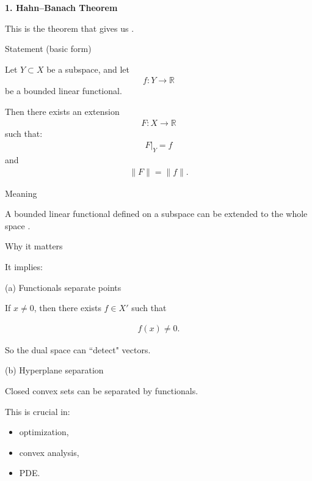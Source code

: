 \documentclass[12pt,a4paper]{report}
\begin{document}
\begin{description}

\item \textbf{1. Hahn–Banach Theorem}

This is the theorem that gives us .

	\begin{description}
    \item Statement (basic form)

Let $Y\subset X$ be a subspace, and let
\begin{align*}
f:Y\to \mathbb{R}
\end{align*}
be a bounded linear functional.

Then there exists an extension
\begin{align*}
F:X\to\mathbb{R}
\end{align*}
such that:
\begin{align*}
F|_Y=f
\end{align*}
and
\begin{align*}
\|F\|=\|f\|.
\end{align*}

    \item Meaning

A bounded linear functional defined on a subspace can be extended to the whole space .

    \item Why it matters

It implies:
		\begin{description}
        \item (a) Functionals separate points

If $x\neq 0$, then there exists $f\in X'$ such that

\begin{align*}
f(x)\neq 0.
\end{align*}

So the dual space can ``detect" vectors.

        \item (b) Hyperplane separation

Closed convex sets can be separated by functionals.

		\end{description}

This is crucial in:
	\begin{itemize}
    \item optimization,
    \item convex analysis,
    \item PDE.
	\end{itemize}


\end{description}
\end{description}
\end{document}
